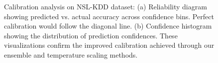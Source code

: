 \documentclass[journal]{IEEEtran}
\begin{document}
\begin{figure}[t]
\centering
{}
\caption{Calibration analysis on NSL-KDD dataset: (a) Reliability diagram showing predicted vs. actual accuracy across confidence bins. Perfect calibration would follow the diagonal line. (b) Confidence histogram showing the distribution of prediction confidences. These visualizations confirm the improved calibration achieved through our ensemble and temperature scaling methods.}
\label{fig:calibration}
\end{figure}
\end{document}
